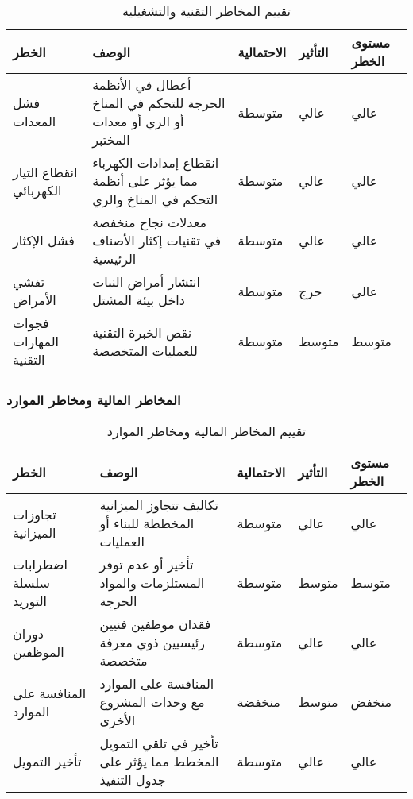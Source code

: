 \begin{table}[h]
\centering
\begin{tabular}{|p{4cm}|p{4cm}|p{2cm}|p{2cm}|p{3cm}|}
\hline
\textbf{الخطر} & \textbf{الوصف} & \textbf{الاحتمالية} & \textbf{التأثير} & \textbf{مستوى الخطر} \\
\hline
فشل المعدات & أعطال في الأنظمة الحرجة للتحكم في المناخ أو الري أو معدات المختبر & متوسطة & عالي & عالي \\
\hline
انقطاع التيار الكهربائي & انقطاع إمدادات الكهرباء مما يؤثر على أنظمة التحكم في المناخ والري & متوسطة & عالي & عالي \\
\hline
فشل الإكثار & معدلات نجاح منخفضة في تقنيات إكثار الأصناف الرئيسية & متوسطة & عالي & عالي \\
\hline
تفشي الأمراض & انتشار أمراض النبات داخل بيئة المشتل & متوسطة & حرج & عالي \\
\hline
فجوات المهارات التقنية & نقص الخبرة التقنية للعمليات المتخصصة & متوسطة & متوسط & متوسط \\
\hline
\end{tabular}
\caption{تقييم المخاطر التقنية والتشغيلية}
\end{table}

\subsubsection{المخاطر المالية ومخاطر الموارد}

\begin{table}[h]
\centering
\begin{tabular}{|p{4cm}|p{4cm}|p{2cm}|p{2cm}|p{3cm}|}
\hline
\textbf{الخطر} & \textbf{الوصف} & \textbf{الاحتمالية} & \textbf{التأثير} & \textbf{مستوى الخطر} \\
\hline
تجاوزات الميزانية & تكاليف تتجاوز الميزانية المخططة للبناء أو العمليات & متوسطة & عالي & عالي \\
\hline
اضطرابات سلسلة التوريد & تأخير أو عدم توفر المستلزمات والمواد الحرجة & متوسطة & متوسط & متوسط \\
\hline
دوران الموظفين & فقدان موظفين فنيين رئيسيين ذوي معرفة متخصصة & متوسطة & عالي & عالي \\
\hline
المنافسة على الموارد & المنافسة على الموارد مع وحدات المشروع الأخرى & منخفضة & متوسط & منخفض \\
\hline
تأخير التمويل & تأخير في تلقي التمويل المخطط مما يؤثر على جدول التنفيذ & متوسطة & عالي & عالي \\
\hline
\end{tabular}
\caption{تقييم المخاطر المالية ومخاطر الموارد}
\end{table}

